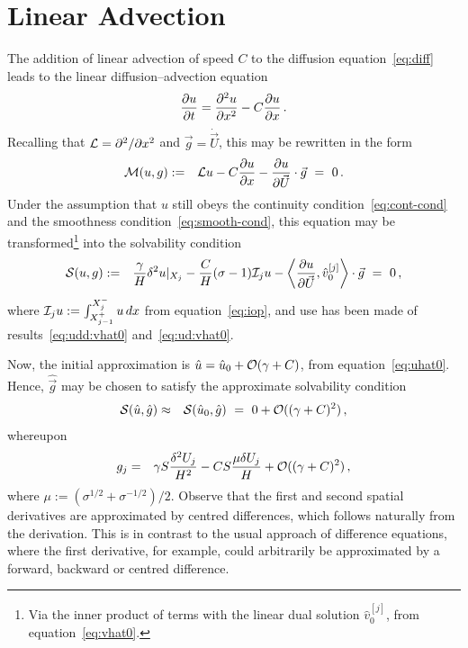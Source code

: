 \documentclass[12pt,a5paper]{article}
\begin{document}
\section{Linear Advection}
The addition of linear advection of speed $C$ to the diffusion equation~\eqref{eq:diff} leads to the
linear diffusion--advection equation
\begin{eqnarray}
	\D tu = \DD xu - C\D xu\,.
	\label{eq:diff-adv}
\end{eqnarray}
Recalling that ${\cal L}=\DD{x}{}$ and $\vec{g}=\dot{\vec{U}}$, this may be rewritten in the form
\begin{eqnarray}
{\cal M}(u,g) & := & {\cal L}u-C\D xu-\D{\vec{U}}{u}\cdot\vec{g}~=~0\,.
\end{eqnarray}
Under the assumption that $u$ still obeys the continuity condition~\eqref{eq:cont-cond} and the smoothness condition~\eqref{eq:smooth-cond}, this equation may be transformed\footnote{Via the inner product of terms with the
linear dual solution $\hat{v}_0^{[j]}$, from equation~\eqref{eq:vhat0}.} into the solvability condition
\begin{eqnarray}
       {\cal S}(u,g) & := & 
          \frac{\gamma}{H}\delta^2u|_{X_j} - \frac{C}{H}(\sigma-1){\cal I}_j u
	-\left\langle\D {\vec U}u,\hat{v}_0^{[j]}\right\rangle\cdot\vec{g}~=~0 \,,
\end{eqnarray}
where ${\cal I}_j u := \int_{X^+_{j-1}}^{X^-_j}u\,dx$
from equation~\eqref{eq:iop}, and
use has been made of results~\eqref{eq:udd:vhat0} and~\eqref{eq:ud:vhat0}.

Now, the initial approximation is $\hat{u}=\hat{u}_0+{\cal O}(\gamma+C)$, from equation~\eqref{eq:uhat0}.
Hence, $\hat{\vec{g}}$ may be chosen to satisfy the approximate solvability condition 
\begin{eqnarray}
{\cal S}(\hat{u},\hat{g}) & \approx & {\cal S}(\hat{u}_0,\hat{g})~=~0+{\cal O}((\gamma+C)^2)\,,
\end{eqnarray}
whereupon
\begin{eqnarray}
	g_{j} & = & 
\gamma S\frac{\delta^2U_j}{H^2} - CS\frac{\mu\delta U_j}{H} + {\cal O}((\gamma+C)^2)\,,
\end{eqnarray}
where $\mu:=(\sigma^{{1}/{2}}+\sigma^{-{1}/{2}})/2$. 
Observe that the first and second spatial derivatives are approximated by centred differences, which follows
naturally from the derivation. This is in contrast to the usual approach of difference equations,
where the first derivative, for example, could arbitrarily be approximated by a forward, backward or centred difference.
\end{document}
